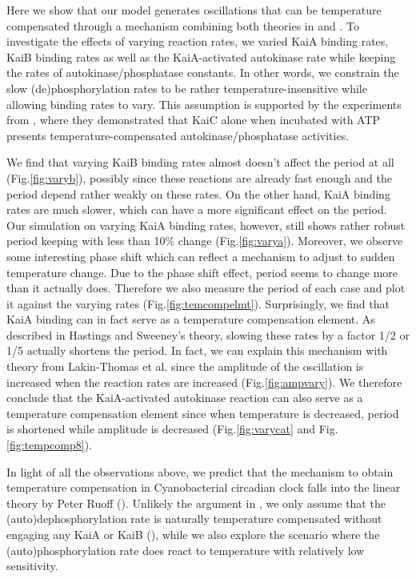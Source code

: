 \documentclass[a4paper,10pt]{article}
\numberwithin{equation}{section}
\begin{document}
Here we show that our model generates oscillations that can be temperature compensated through a mechanism combining both theories in \citet{ruoff2004} and \citet{lakin1991}. To investigate the effects of varying reaction rates, we varied KaiA binding rates, KaiB binding rates as well as the KaiA-activated autokinase rate while keeping the rates of autokinase/phosphatase constants. In other words, we constrain the slow (de)phosphorylation rates to be rather  temperature-insensitive while allowing binding rates to vary. This assumption is supported by the experiments from \citet{Tamito2005}, where they demonstrated that  KaiC alone when incubated with ATP presents temperature-compensated autokinase/phosphatase activities.

We find that varying KaiB binding rates almost doesn't affect the period at all (Fig.\ref{fig:varyb}), possibly since these reactions are already fast enough and the period depend rather weakly on these rates. On the other hand, KaiA binding rates are much slower, which can have a more significant effect on the period. Our simulation on varying KaiA binding rates, however, still shows rather robust period keeping with less than 10\% change (Fig.\ref{fig:varya}). Moreover, we observe some interesting phase shift which can reflect a mechanism to adjust to sudden temperature change. Due to the phase shift effect, period seems to change more than it actually does. Therefore we also measure the period of each case and plot it against the varying rates (Fig.\ref{fig:temcompelmt}). Surprisingly, we find that KaiA binding can in fact serve as a temperature compensation element. As described in Hastings and Sweeney's theory, slowing these rates by a factor 1/2 or 1/5 actually shortens the period. In fact, we can explain this mechanism with theory from Lakin-Thomas et al. since the amplitude of the oscillation is increased when the reaction rates are increased (Fig.\ref{fig:ampvary}). We therefore conclude that the KaiA-activated autokinase reaction can also serve as a temperature compensation element since when temperature is decreased, period is shortened while amplitude is decreased (Fig.\ref{fig:varycat} and Fig. \ref{fig:tempcomp8}). 

In light of all the observations above, we predict that the mechanism to obtain temperature compensation in Cyanobacterial circadian clock falls into the linear theory by Peter Ruoff (\citet{ruoff1997}). Unlikely the argument in \citet{van2007}, we only assume that the (auto)dephosphorylation rate is naturally temperature compensated without engaging any KaiA or KaiB  (\citet{Tamito2005}), while we also explore the scenario where the (auto)phosphorylation rate does react to temperature with relatively low sensitivity.
 
\end{document}
